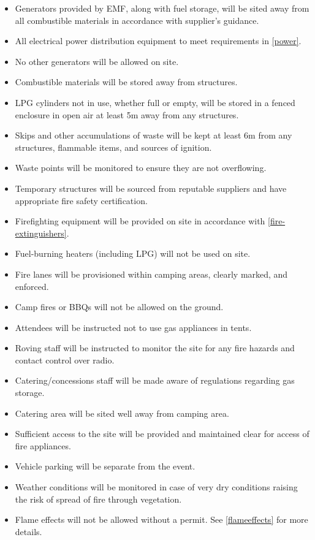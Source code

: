 \begin{itemize}
\tightlist
\item Generators provided by EMF, along with fuel storage, will be sited away from all
      combustible materials in accordance with supplier's guidance.
\item All electrical power distribution equipment to meet requirements in \cref{power}.
\item No other generators will be allowed on site.
\item Combustible materials will be stored away from structures.
\item LPG cylinders not in use, whether full or empty, will be stored in a fenced enclosure in open air at least 5m
      away from any structures.
\item Skips and other accumulations of waste will be kept at least 6m from any structures, flammable items, and sources of ignition.
\item Waste points will be monitored to ensure they are not overflowing.
\item Temporary structures will be sourced from reputable suppliers and have appropriate fire safety certification.
\item Firefighting equipment will be provided on site in accordance with \cref{fire-extinguishers}.
\item Fuel-burning heaters (including LPG) will not be used on site.
\item Fire lanes will be provisioned within camping areas, clearly marked, and enforced.
\item Camp fires or BBQs will not be allowed on the ground.
\item Attendees will be instructed not to use gas appliances in tents.
\item Roving staff will be instructed to monitor the site for any fire hazards and contact control over radio.
\item Catering/concessions staff will be made aware of regulations regarding gas storage.
\item Catering area will be sited well away from camping area.
\item Sufficient access to the site will be provided and maintained clear for access of fire appliances.
\item Vehicle parking will be separate from the event.
\item Weather conditions will be monitored in case of very dry conditions raising the risk of spread of fire through vegetation.
\item Flame effects will not be allowed without a permit. See \cref{flameeffects} for more details.
\end{itemize}

